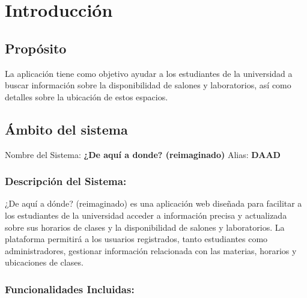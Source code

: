 
\section{Introducción}

\subsection{Propósito}
La aplicación tiene como objetivo ayudar a los estudiantes de la universidad a buscar información sobre la disponibilidad de salones y laboratorios, así como detalles sobre la ubicación de estos espacios.

\subsection{Ámbito del sistema}

Nombre del Sistema: \textbf{¿De aquí a donde? (reimaginado)}
Alias: \textbf{DAAD}

\subsubsection{Descripción del Sistema:}

¿De aquí a dónde? (reimaginado) es una aplicación web diseñada para facilitar a los estudiantes de la universidad acceder a información precisa y actualizada sobre sus horarios de clases y la disponibilidad de salones y laboratorios. La plataforma permitirá a los usuarios registrados, tanto estudiantes como administradores, gestionar información relacionada con las materias, horarios y ubicaciones de clases.

\subsubsection{Funcionalidades Incluidas:}

